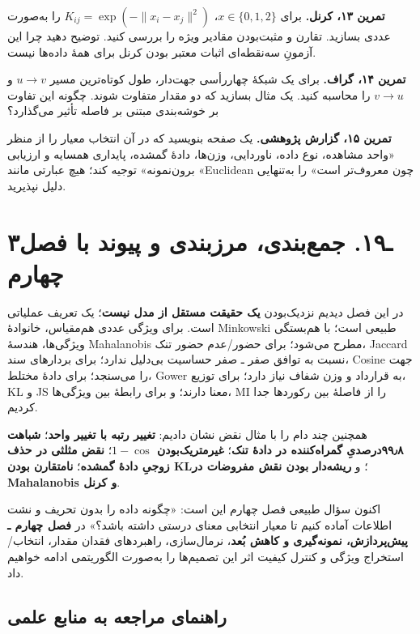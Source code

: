 \documentclass[12pt,a4paper,oneside]{book}
\begin{document}
\textbf{تمرین ۱۳، کرنل.} برای \(x\in\{0,1,2\}\)، \(K_{ij}=\exp(-\|x_i-x_j\|^2)\) را به‌صورت عددی بسازید. تقارن و مثبت‌بودن مقادیر ویژه را بررسی کنید. توضیح دهید چرا این آزمونِ سه‌نقطه‌ای اثبات معتبر بودن کرنل برای همهٔ داده‌ها نیست.

\textbf{تمرین ۱۴، گراف.} برای یک شبکهٔ چهاررأسی جهت‌دار، طول کوتاه‌ترین مسیر \(u\to v\) و \(v\to u\) را محاسبه کنید. یک مثال بسازید که دو مقدار متفاوت شوند. چگونه این تفاوت بر خوشه‌بندی مبتنی بر فاصله تأثیر می‌گذارد؟

\textbf{تمرین ۱۵، گزارش پژوهشی.} یک صفحه بنویسید که در آن انتخاب معیار را از منظر «واحد مشاهده، نوع داده، ناوردایی، وزن‌ها، دادهٔ گمشده، پایداری همسایه و ارزیابی برون‌نمونه» توجیه کند؛ هیچ عبارتی مانند «Euclidean چون معروف‌تر است» را به‌تنهایی دلیل نپذیرید.

\section{۳ـ۱۹. جمع‌بندی، مرزبندی و پیوند با فصل چهارم}\label{ux640ux6f1ux6f9.-ux62cux645ux639ux628ux646ux62fux6cc-ux645ux631ux632ux628ux646ux62fux6cc-ux648-ux67eux6ccux648ux646ux62f-ux628ux627-ux641ux635ux644-ux686ux647ux627ux631ux645}

در این فصل دیدیم نزدیک‌بودن \textbf{یک حقیقت مستقل از مدل نیست}؛ یک تعریف عملیاتی است. برای ویژگی عددی هم‌مقیاس، خانوادهٔ Minkowski طبیعی است؛ با هم‌بستگی ویژگی‌ها، هندسهٔ Mahalanobis مطرح می‌شود؛ برای حضور/عدم حضور تنک، Jaccard نسبت به توافق صفر ـ صفر حساسیت بی‌دلیل ندارد؛ برای بردارهای سند، Cosine جهت را می‌سنجد؛ برای دادهٔ مختلط، Gower به قرارداد و وزن شفاف نیاز دارد؛ برای توزیع، KL و JS معنا دارند؛ و برای رابطهٔ بین ویژگی‌ها، MI را از فاصلهٔ بین رکوردها جدا کردیم.

همچنین چند دام را با مثال نقض نشان دادیم: \textbf{تغییر رتبه با تغییر واحد}؛ \textbf{شباهت ۹۹٫۸درصدیِ گمراه‌کننده در دادهٔ تنک}؛ \textbf{غیرمتریک‌بودن \(1-\cos\)}؛ \textbf{نقض مثلثی در حذف زوجیِ دادهٔ گمشده}؛ \textbf{نامتقارن بودن KL}؛ و \textbf{ریشه‌دار بودن نقش مفروضات در Mahalanobis و کرنل}.

اکنون سؤال طبیعی فصل چهارم این است: «چگونه داده را بدون تحریف و نشت اطلاعات آماده کنیم تا معیار انتخابی معنای درستی داشته باشد؟» در \textbf{فصل چهارم ـ پیش‌پردازش، نمونه‌گیری و کاهش بُعد}، نرمال‌سازی، راهبردهای فقدان مقدار، انتخاب/استخراج ویژگی و کنترل کیفیت اثر این تصمیم‌ها را به‌صورت الگوریتمی ادامه خواهیم داد.

\subsection{راهنمای مراجعه به منابع علمی}\label{ux631ux627ux647ux646ux645ux627ux6cc-ux645ux631ux627ux62cux639ux647-ux628ux647-ux645ux646ux627ux628ux639-ux639ux644ux645ux6cc}
\end{document}
